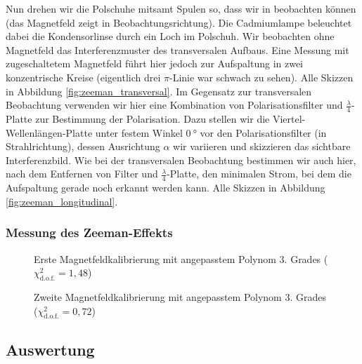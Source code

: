 \documentclass[11pt, a4paper]{article}
\begin{document}
Nun drehen wir die Polschuhe mitsamt Spulen so, dass wir in  beobachten können (das Magnetfeld zeigt in Beobachtungsrichtung).
Die Cadmiumlampe beleuchtet dabei die Kondensorlinse durch ein Loch im Polschuh.
Wir beobachten ohne Magnetfeld das Interferenzmuster des transversalen Aufbaus.
Eine Messung mit zugeschaltetem Magnetfeld führt hier jedoch zur Aufspaltung in zwei konzentrische Kreise (eigentlich drei $\pi$-Linie war schwach zu sehen).
Alle Skizzen in Abbildung \ref{fig:zeeman_transversal}.
Im Gegensatz zur transversalen Beobachtung verwenden wir hier eine Kombination von Polarisationsfilter und $\frac{\lambda}{4}$-Platte zur Bestimmung der Polarisation.
Dazu stellen wir die Viertel-Wellenlängen-Platte unter festem Winkel $\SI{0}{\degree}$ vor den Polarisationsfilter (in Strahlrichtung), dessen Ausrichtung $\alpha$ wir variieren und skizzieren das sichtbare Interferenzbild.
Wie bei der transversalen Beobachtung bestimmen wir auch hier, nach dem Entfernen von Filter und $\frac{\lambda}{4}$-Platte, den minimalen Strom, bei dem die Aufspaltung gerade noch erkannt werden kann.
Alle Skizzen in Abbildung \ref{fig:zeeman_longitudinal}.

\subsubsection{Messung des Zeeman-Effekts}

\begin{figure}[h]
\centering

\caption{Erste Magnetfeldkalibrierung mit angepasstem Polynom 3. Grades ($\chi_\mathrm{d.o.f.}^2=1,48$)}
\label{fig:kalibrierung1}
\end{figure}
\begin{figure}[h]
\centering

\caption{Zweite Magnetfeldkalibrierung mit angepasstem Polynom 3. Grades ($\chi_\mathrm{d.o.f.}^2=0,72$)}
\label{fig:kalibrierung2}
\end{figure}

\FloatBarrier

\subsection{Auswertung}
\end{document}
